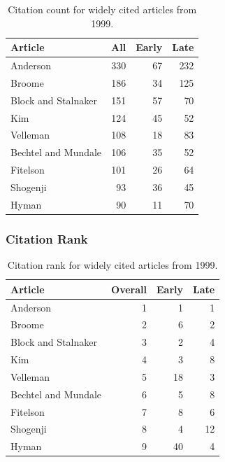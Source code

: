 \documentclass[
  10pt,
  letterpaper,
  DIV=11,
  numbers=noendperiod,
  twoside]{scrartcl}
\begin{document}
\begin{longtable}[]{@{}lrrr@{}}

\caption{\label{tbl-citation-count-1999}Citation count for widely cited
articles from 1999.}

\tabularnewline

\toprule\noalign{}
Article & All & Early & Late \\
\midrule\noalign{}
\endhead
\bottomrule\noalign{}
\endlastfoot
Anderson & 330 & 67 & 232 \\
Broome & 186 & 34 & 125 \\
Block and Stalnaker & 151 & 57 & 70 \\
Kim & 124 & 45 & 52 \\
Velleman & 108 & 18 & 83 \\
Bechtel and Mundale & 106 & 35 & 52 \\
Fitelson & 101 & 26 & 64 \\
Shogenji & 93 & 36 & 45 \\
Hyman & 90 & 11 & 70 \\

\end{longtable}

\subsubsection*{Citation Rank}\label{sec-rank-1999}

\begin{longtable}[]{@{}lrrr@{}}

\caption{\label{tbl-citation-rank-1999}Citation rank for widely cited
articles from 1999.}

\tabularnewline

\toprule\noalign{}
Article & Overall & Early & Late \\
\midrule\noalign{}
\endhead
\bottomrule\noalign{}
\endlastfoot
Anderson & 1 & 1 & 1 \\
Broome & 2 & 6 & 2 \\
Block and Stalnaker & 3 & 2 & 4 \\
Kim & 4 & 3 & 8 \\
Velleman & 5 & 18 & 3 \\
Bechtel and Mundale & 6 & 5 & 8 \\
Fitelson & 7 & 8 & 6 \\
Shogenji & 8 & 4 & 12 \\
Hyman & 9 & 40 & 4 \\

\end{longtable}
\end{document}
